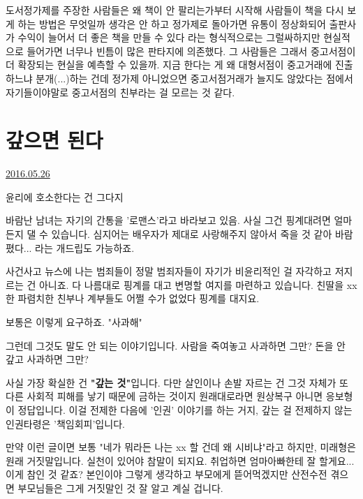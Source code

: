 도서정가제를 주장한 사람들은 왜 책이 안 팔리는가부터 시작해 사람들이 책을 다시 보게 하는 방법은 무엇일까 생각은 안 하고
정가제로 돌아가면 유통이 정상화되어 출판사가 수익이 늘어서 더 좋은 책을 만들 수 있다 라는
형식적으로는 그럴싸하지만 현실적으로 들어가면 너무나 빈틈이 많은 판타지에 의존했다.
그 사람들은 그래서 중고서점이 더 확장되는 현실을 예측할 수 있을까.
지금 한다는 게 왜 대형서점이 중고거래에 진출하느냐 분개(...)하는 건데 정가제 아니었으면 중고서점거래가 늘지도 않았다는 점에서
자기들이야말로 중고서점의 친부라는 걸 모르는 것 같다.
\vspace{5mm}






\section{갚으면 된다}
\href{https://www.kockoc.com/Apoc/793885}{2016.05.26}

\vspace{5mm}

윤리에 호소한다는 건 그다지
\vspace{5mm}

바람난 남녀는 자기의 간통을 '로맨스'라고 바라보고 있음.
사실 그건 핑계대려면 얼마든지 댈 수 있습니다.
심지어는 배우자가 제대로 사랑해주지 않아서 죽을 것 같아 바람폈다... 라는 개드립도 가능하죠.
\vspace{5mm}

사건사고 뉴스에 나는 범죄들이 정말 범죄자들이 자기가 비윤리적인 걸 자각하고 저지르는 건 아니죠.
다 나름대로 핑계를 대고 변명할 여지를 마련하고 있습니다.
친딸을 xx한 파렴치한 친부나 계부들도 어쩔 수가 없었다 핑계를 대지요.
\vspace{5mm}

보통은 이렇게 요구하죠. "사과해"
\vspace{5mm}

그런데 그것도 말도 안 되는 이야기입니다.
사람을 죽여놓고 사과하면 그만?
돈을 안 갚고 사과하면 그만?
\vspace{5mm}

사실 가장 확실한 건 \textbf{"갚는 것"}입니다.
다만 살인이나 손발 자르는 건 그것 자체가 또 다른 사회적 피해를 낳기 때문에 금하는 것이지
원래대로라면 원상복구 아니면 응보형이 정답입니다.
이걸 전제한 다음에 '인권' 이야기를 하는 거지, 갚는 걸 전제하지 않는 인권타령은 '책임회피'입니다.
\vspace{5mm}

만약 이런 글이면 보통 "네가 뭐라든 나는 xx 할 건데 왜 시비냐"라고 하지만,
미래형은 원래 거짓말입니다. 실천이 있어야 참말이 되지요.
취업하면 엄마아빠한테 잘 할게요... 이게 참인 것 같죠? 본인이야 그렇게 생각하고 부모에게 뜯어먹겠지만
산전수전 겪으면 부모님들은 그게 거짓말인 것 잘 알고 계실 겁니다.
\vspace{5mm}

